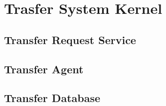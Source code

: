 \section{Trasfer System Kernel}

\subsection{Transfer Request Service}
\subsection{Transfer Agent}
\subsection{Transfer Database}
